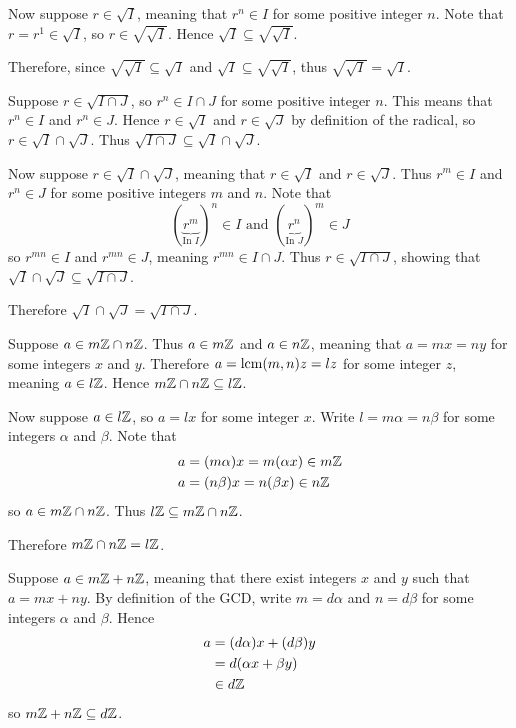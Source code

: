 \begin{questions}
\begin{partquestions}{\alph*}
        Now suppose $r \in \sqrt{I}$, meaning that $r^n \in I$ for some positive integer $n$. Note that $r = r^1 \in \sqrt{I}$, so $r \in \sqrt{\sqrt{I}}$. Hence $\sqrt{I} \subseteq \sqrt{\sqrt{I}}$.

        Therefore, since $\sqrt{\sqrt{I}} \subseteq \sqrt{I}$ and $\sqrt{I} \subseteq \sqrt{\sqrt{I}}$, thus $\sqrt{\sqrt{I}} = \sqrt{I}$.

        \item Suppose $r \in \sqrt{I\cap J}$, so $r^n \in I \cap J$ for some positive integer $n$. This means that $r^n \in I$ and $r^n \in J$. Hence $r \in \sqrt{I}$ and $r \in \sqrt{J}$ by definition of the radical, so $r \in \sqrt{I}\cap\sqrt{J}$. Thus $\sqrt{I\cap J} \subseteq \sqrt{I}\cap\sqrt{J}$.
        
        Now suppose $r \in \sqrt{I}\cap\sqrt{J}$, meaning that $r \in \sqrt{I}$ and $r \in \sqrt{J}$. Thus $r^m \in I$ and $r^n \in J$ for some positive integers $m$ and $n$. Note that
        \[
            (\underbrace{r^m}_{\text{In }I})^n \in I \text{ and } (\underbrace{r^n}_{\text{In }J})^m \in J
        \]
        so $r^{mn} \in I$ and $r^{mn} \in J$, meaning $r^{mn} \in I \cap J$. Thus $r \in \sqrt{I \cap J}$, showing that $\sqrt{I}\cap\sqrt{J} \subseteq \sqrt{I\cap J}$.

        Therefore $\sqrt{I}\cap\sqrt{J} = \sqrt{I\cap J}$.
    \end{partquestions}

    \item \begin{partquestions}{\alph*}
        \item Suppose $a \in m\mathbb{Z}\cap n\mathbb{Z}$. Thus $a \in m\mathbb{Z}$ and $a \in n\mathbb{Z}$, meaning that $a = mx = ny$ for some integers $x$ and $y$. Therefore $a = \mathrm{lcm}(m,n)z = lz$ for some integer $z$, meaning $a \in l\mathbb{Z}$. Hence $m\mathbb{Z} \cap n\mathbb{Z} \subseteq l\mathbb{Z}$.
        
        Now suppose $a \in l\mathbb{Z}$, so $a = lx$ for some integer $x$. Write $l = m\alpha = n\beta$ for some integers $\alpha$ and $\beta$. Note that
        \begin{align*}
            a &= (m\alpha)x = m(\alpha x) \in m\mathbb{Z}\\
            a &= (n\beta)x = n(\beta x) \in n\mathbb{Z}
        \end{align*}
        so $a \in m\mathbb{Z} \cap n\mathbb{Z}$. Thus $l\mathbb{Z} \subseteq m\mathbb{Z} \cap n\mathbb{Z}$.

        Therefore $m\mathbb{Z}\cap n\mathbb{Z} = l\mathbb{Z}$.

        \item Suppose $a \in m\mathbb{Z} + n\mathbb{Z}$, meaning that there exist integers $x$ and $y$ such that $a = mx + ny$. By definition of the GCD, write $m = d\alpha$ and $n = d\beta$ for some integers $\alpha$ and $\beta$. Hence
        \begin{align*}
            a &= (d\alpha)x + (d\beta)y\\
            &= d(\alpha x + \beta y)\\
            &\in d\mathbb{Z}
        \end{align*}
        so $m\mathbb{Z} + n\mathbb{Z} \subseteq d\mathbb{Z}$.


\end{partquestions}
\end{questions}

